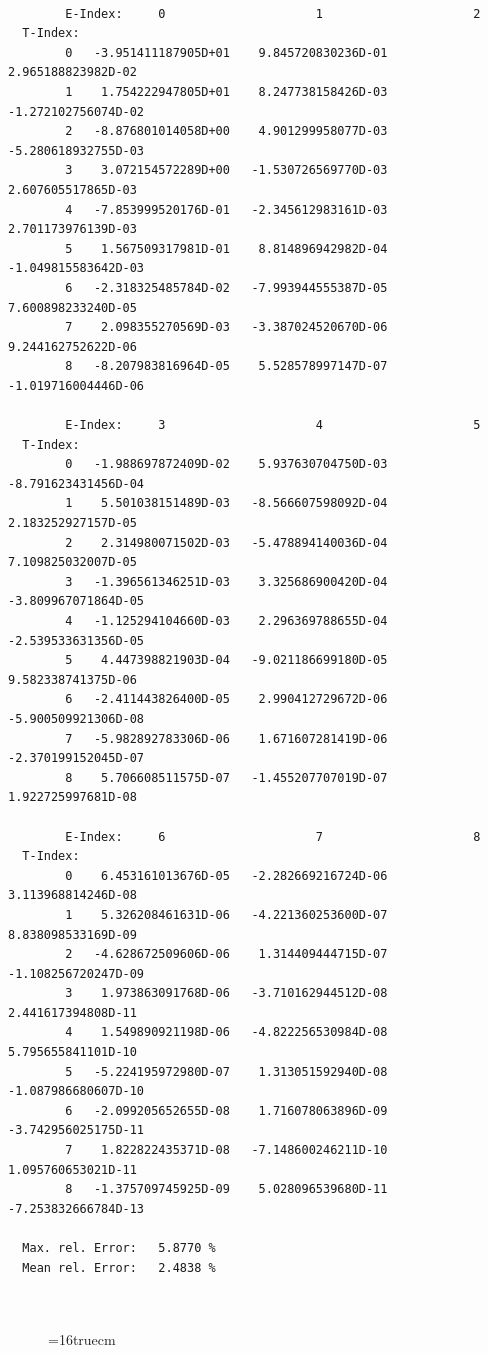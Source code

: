 \documentclass[12pt,dvips]{article}
\begin{document}
\begin{small}\begin{verbatim}

        E-Index:     0                     1                     2
  T-Index:
        0   -3.951411187905D+01    9.845720830236D-01    2.965188823982D-02
        1    1.754222947805D+01    8.247738158426D-03   -1.272102756074D-02
        2   -8.876801014058D+00    4.901299958077D-03   -5.280618932755D-03
        3    3.072154572289D+00   -1.530726569770D-03    2.607605517865D-03
        4   -7.853999520176D-01   -2.345612983161D-03    2.701173976139D-03
        5    1.567509317981D-01    8.814896942982D-04   -1.049815583642D-03
        6   -2.318325485784D-02   -7.993944555387D-05    7.600898233240D-05
        7    2.098355270569D-03   -3.387024520670D-06    9.244162752622D-06
        8   -8.207983816964D-05    5.528578997147D-07   -1.019716004446D-06

        E-Index:     3                     4                     5
  T-Index:
        0   -1.988697872409D-02    5.937630704750D-03   -8.791623431456D-04
        1    5.501038151489D-03   -8.566607598092D-04    2.183252927157D-05
        2    2.314980071502D-03   -5.478894140036D-04    7.109825032007D-05
        3   -1.396561346251D-03    3.325686900420D-04   -3.809967071864D-05
        4   -1.125294104660D-03    2.296369788655D-04   -2.539533631356D-05
        5    4.447398821903D-04   -9.021186699180D-05    9.582338741375D-06
        6   -2.411443826400D-05    2.990412729672D-06   -5.900509921306D-08
        7   -5.982892783306D-06    1.671607281419D-06   -2.370199152045D-07
        8    5.706608511575D-07   -1.455207707019D-07    1.922725997681D-08

        E-Index:     6                     7                     8
  T-Index:
        0    6.453161013676D-05   -2.282669216724D-06    3.113968814246D-08
        1    5.326208461631D-06   -4.221360253600D-07    8.838098533169D-09
        2   -4.628672509606D-06    1.314409444715D-07   -1.108256720247D-09
        3    1.973863091768D-06   -3.710162944512D-08    2.441617394808D-11
        4    1.549890921198D-06   -4.822256530984D-08    5.795655841101D-10
        5   -5.224195972980D-07    1.313051592940D-08   -1.087986680607D-10
        6   -2.099205652655D-08    1.716078063896D-09   -3.742956025175D-11
        7    1.822822435371D-08   -7.148600246211D-10    1.095760653021D-11
        8   -1.375709745925D-09    5.028096539680D-11   -7.253832666784D-13

  Max. rel. Error:   5.8770 %
  Mean rel. Error:   2.4838 %



\end{verbatim}\end{small}
\begin{figure} \label{2.2.5d}
\epsfxsize=16truecm
\end{figure}
\end{document}
